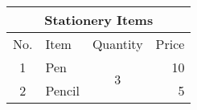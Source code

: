 \documentclass{article}
\begin{document}
	\renewcommand{\arraystretch}{1.5}
	\begin{tabular}{|c|l|c|r|}
		\hline
		\multicolumn{4}{|c|}{Stationery Items} \\
		\hline
		No. & Item & Quantity & Price \\
		\hline
		1 & Pen & \multirow{2}{*}{3} & 10 \\
		\cline{1-2}\cline{4-4}
		2 & Pencil & & 5 \\
		\hline
	\end{tabular}
\end{document}
